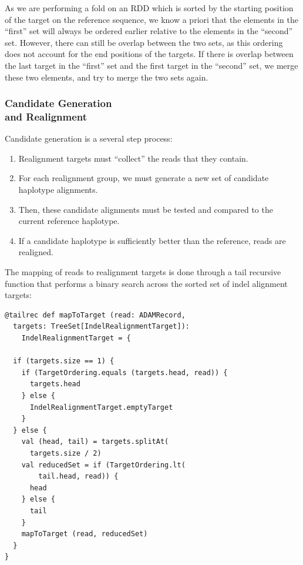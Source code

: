 \documentclass{acm_proc_article-sp}
\begin{document}
As we are performing a fold on an RDD which is sorted by the starting position of the target on the reference sequence, we know a priori that the elements
in the ``first'' set will always be ordered earlier relative to the elements in the ``second'' set. However, there can still be overlap between the two sets, as this
ordering does not account for the end positions of the targets. If there is overlap between the last target in the ``first'' set and the first target in the ``second''
set, we merge these two elements, and try to merge the two sets again.

\subsubsection{Candidate Generation\\and Realignment}
\label{sec:candidate-generation-realignment}

Candidate generation is a several step process:

\begin{enumerate}
\item Realignment targets must ``collect'' the reads that they contain.
\item For each realignment group, we must generate a new set of candidate haplotype alignments.
\item Then, these candidate alignments must be tested and compared to the current reference haplotype.
\item If a candidate haplotype is sufficiently better than the reference, reads are realigned.
\end{enumerate}

The mapping of reads to realignment targets is done through a tail recursive function that performs a binary search across the sorted set of indel alignment targets:

\begin{lstlisting}
@tailrec def mapToTarget (read: ADAMRecord,                                                                                                                                                        
  targets: TreeSet[IndelRealignmentTarget]):
    IndelRealignmentTarget = {

  if (targets.size == 1) {
    if (TargetOrdering.equals (targets.head, read)) {
      targets.head
    } else {
      IndelRealignmentTarget.emptyTarget
    }
  } else {
    val (head, tail) = targets.splitAt(
      targets.size / 2)
    val reducedSet = if (TargetOrdering.lt(
        tail.head, read)) {
      head
    } else {
      tail
    }
    mapToTarget (read, reducedSet)
  }
}
\end{lstlisting}
\end{document}
